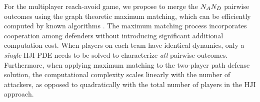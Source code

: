 For the multiplayer reach-avoid game, we propose to merge the $N_AN_D$ pairwise outcomes using the graph theoretic maximum matching, which can be efficiently computed by known algorithms \cite{Schrjiver2004, Karpinski1998}. The maximum matching process incorporates cooperation among defenders without introducing significant additional computation cost. When players on each team have identical dynamics, only a \textit{single} HJI PDE needs to be solved to characterize \textit{all} pairwise outcomes. Furthermore, when applying maximum matching to the two-player path defense solution, the computational complexity scales linearly with the number of attackers, as opposed to quadratically with the total number of players in the HJI approach.